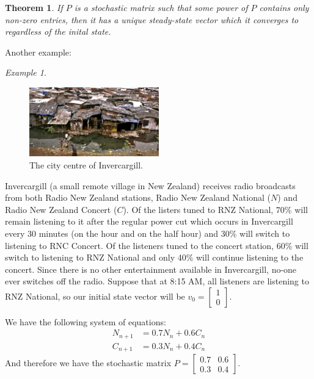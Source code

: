 \documentclass[10pt, a4paper]{amsart}
\newtheorem{thm}{Theorem}
\theoremstyle{definition}
\theoremstyle{remark}
\newtheorem{ex}{Example}
\begin{document}
\begin{thm}
  If $ P $ is a stochastic matrix such that some power of $ P $ contains only non-zero entries,
  then it has a unique steady-state vector which it converges to \emph{regardless of the inital state}.
\end{thm}

Another example:

\begin{ex}
  \begin{figure}
    \includegraphics[width=0.5\textwidth]{invercargill}
    \caption{The city centre of Invercargill.}
    \label{fig:PlaneIntersection}
  \end{figure}
  Invercargill (a small remote village in New Zealand) receives radio broadcasts from both Radio New Zealand
  stations, Radio New Zealand National ($ N $) and Radio New Zealand Concert ($ C $). Of the listers tuned
  to RNZ National, 70\% will remain listening to it after the regular power cut which occurs in Invercargill
  every 30 minutes (on the hour and on the half hour) and 30\% will switch to listening to RNC Concert. Of
  the listeners tuned to the concert station, 60\% will switch to listening to RNZ National and only 40\%
  will continue listening to the concert. Since there is no other entertainment available in Invercargill,
  no-one ever switches off the radio. Suppose that at 8:15 AM, all listeners are listening to RNZ National,
  so our initial state vector will be $ v_0 = \begin{bmatrix} 1 \\ 0 \end{bmatrix} $.

  We have the following system of equations:
  \begin{align*}
    N_{n+1} &= 0.7N_n + 0.6C_n\\
    C_{n+1} &= 0.3N_n + 0.4C_n
  \end{align*}
  And therefore we have the stochastic matrix $ P = \begin{bmatrix} 0.7 & 0.6 \\ 0.3 & 0.4 \end{bmatrix} $.


\end{ex}
\end{document}

